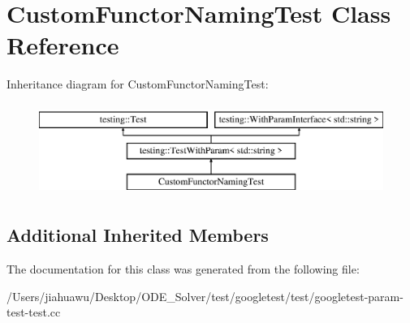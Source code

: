 \hypertarget{class_custom_functor_naming_test}{}\section{Custom\+Functor\+Naming\+Test Class Reference}
\label{class_custom_functor_naming_test}
Inheritance diagram for Custom\+Functor\+Naming\+Test\+:\begin{figure}[H]
\begin{center}
\leavevmode
\includegraphics[height=3.000000cm]{class_custom_functor_naming_test}
\end{center}
\end{figure}
\subsection*{Additional Inherited Members}


The documentation for this class was generated from the following file\+:\begin{DoxyCompactItemize}
\item 
/\+Users/jiahuawu/\+Desktop/\+O\+D\+E\+\_\+\+Solver/test/googletest/test/googletest-\/param-\/test-\/test.\+cc\end{DoxyCompactItemize}

